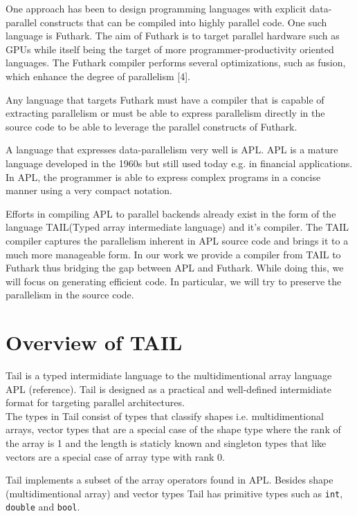 \documentclass[11pt]{article}
\begin{document}
One approach has been to design programming languages with explicit data-parallel constructs that can be compiled into highly parallel code. One such language is Futhark. The aim of Futhark is to target parallel hardware such as GPUs while itself being the target of more programmer-productivity oriented languages. The Futhark compiler performs several optimizations, such as fusion, which enhance the degree of parallelism [4].

Any language that targets Futhark must have a compiler that is capable of extracting parallelism or must be able to express parallelism directly in the source code to be able to leverage the parallel constructs of Futhark.

A language that expresses data-parallelism very well is APL. APL is a mature language developed in the 1960s but still used today e.g. in financial applications. In APL, the programmer is able to express complex programs in a concise manner using a very compact notation.

Efforts in compiling APL to parallel backends already exist in the form of the language TAIL(Typed array intermediate language) and it’s compiler. The TAIL compiler captures the parallelism inherent in APL source code and brings it to a much more manageable form. In our work we provide a compiler from TAIL to Futhark thus bridging the gap between APL and Futhark. While doing  this, we will focus on generating efficient code. In particular, we will try to preserve the parallelism in the source code.

\section{Overview of TAIL}
Tail is a typed intermidiate language to the multidimentional array language APL (reference). Tail is designed as a practical and well-defined intermidiate format for targeting parallel architectures.\\ 

The types in Tail consist of types that classify shapes i.e. multidimentional arrays, vector types that are a special case of the shape type where the rank of the array is 1 and the length is staticly known and singleton types that like vectors are a special case of array type with rank 0. 

Tail implements a subset of the array operators found in APL.
Besides shape (multidimentional array) and vector types Tail has primitive types such as \verb|int|, \verb|double| and \verb|bool|.
\end{document}
